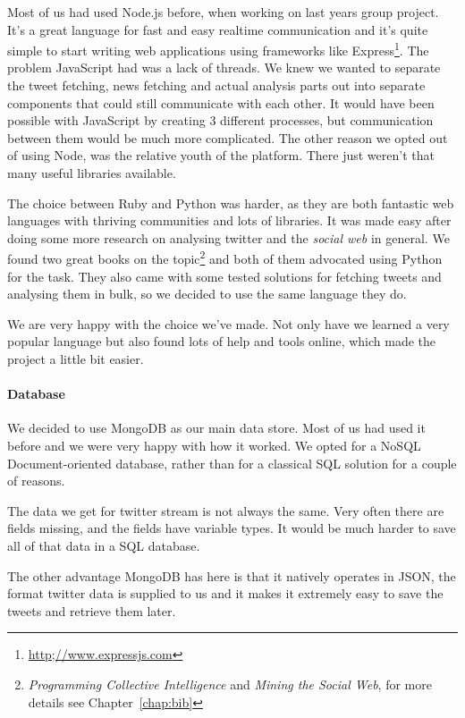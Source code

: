\documentclass{report}
\begin{document}
		Most of us had used Node.js before, when working on last years group project. It's a great language for fast and easy realtime communication and it's quite simple to start writing web applications using frameworks like Express\footnote{\url{http;//www.expressjs.com}}. The problem JavaScript had was a lack of threads. We knew we wanted to separate the tweet fetching, news fetching and actual analysis parts out into separate components that could still communicate with each other. It would have been possible with JavaScript by creating 3 different processes, but communication between them would be much more complicated. The other reason we opted out of using Node, was the relative youth of the platform. There just weren't that many useful libraries available.
		
		The choice between Ruby and Python was harder, as they are both fantastic web languages with thriving communities and lots of libraries. It was made easy after doing some more research on analysing twitter and the \emph{social web} in general. We found two great books on the topic\footnote{\emph{Programming Collective Intelligence} and \emph{Mining the Social Web}, for more details see Chapter~\ref{chap:bib}} and both of them advocated using Python for the task. They also came with some tested solutions for fetching tweets and analysing them in bulk, so we decided to use the same language they do.
		
		We are very happy with the choice we've made. Not only have we learned a very popular language but also found lots of help and tools online, which made the project a little bit easier. 
		
		\paragraph{Database} We decided to use MongoDB as our main data store. Most of us had used it before and we were very happy with how it worked. We opted for a NoSQL Document-oriented database, rather than for a classical SQL solution for a couple of reasons.
		
		The data we get for twitter stream is not always the same. Very often there are fields missing, and the fields have variable types. It would be much harder to save all of that data in a SQL database.
		
		The other advantage MongoDB has here is that it natively operates in JSON, the format twitter data is supplied to us and it makes it extremely easy to save the tweets and retrieve them later.
		
\end{document}
